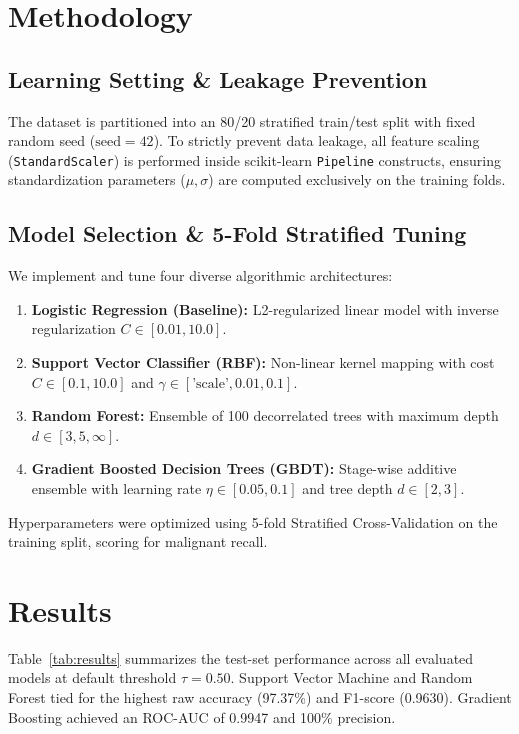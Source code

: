 \documentclass[conference]{IEEEtran}
\begin{document}
\section{Methodology}
\subsection{Learning Setting & Leakage Prevention}
The dataset is partitioned into an 80/20 stratified train/test split with fixed random seed ($\text{seed}=42$). To strictly prevent data leakage, all feature scaling (\texttt{StandardScaler}) is performed inside scikit-learn \texttt{Pipeline} constructs, ensuring standardization parameters ($\mu, \sigma$) are computed exclusively on the training folds.

\subsection{Model Selection & 5-Fold Stratified Tuning}
We implement and tune four diverse algorithmic architectures:
\begin{enumerate}
\item \textbf{Logistic Regression (Baseline):} L2-regularized linear model with inverse regularization $C \in [0.01, 10.0]$.
\item \textbf{Support Vector Classifier (RBF):} Non-linear kernel mapping with cost $C \in [0.1, 10.0]$ and $\gamma \in [\text{'scale'}, 0.01, 0.1]$.
\item \textbf{Random Forest:} Ensemble of 100 decorrelated trees with maximum depth $d \in [3, 5, \infty]$.
\item \textbf{Gradient Boosted Decision Trees (GBDT):} Stage-wise additive ensemble with learning rate $\eta \in [0.05, 0.1]$ and tree depth $d \in [2, 3]$.
\end{enumerate}
Hyperparameters were optimized using 5-fold Stratified Cross-Validation on the training split, scoring for malignant recall.

\section{Results}
Table~\ref{tab:results} summarizes the test-set performance across all evaluated models at default threshold $\tau=0.50$. Support Vector Machine and Random Forest tied for the highest raw accuracy (97.37\%) and F1-score (0.9630). Gradient Boosting achieved an ROC-AUC of 0.9947 and 100\% precision.
\end{document}
